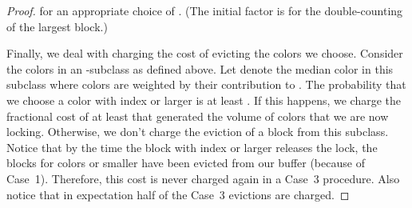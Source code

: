 \documentclass[12pt]{article}
\begin{document}
\begin{proof}
for an appropriate choice of . (The initial 
factor is for the double-counting of the largest block.)

Finally, we deal with charging the cost of evicting the colors
we choose. Consider the colors  in an
-subclass as defined above. Let  denote the median
color in this subclass where colors are weighted by their
contribution to . The probability that we choose
a color with index  or larger is at least . If
this happens, we charge the fractional cost of at least
 that generated 
the volume of colors 
 that we are now locking. Otherwise, we
don't charge the eviction of a block from this subclass.
Notice that
by the time the block with index  or larger releases the
lock, the blocks for colors  or smaller have been evicted
from our buffer (because of Case~1). Therefore, this cost is 
never charged again in a Case~3 procedure. Also notice that
in expectation half of the Case~3 evictions are charged.
\end{proof}
\end{document}
